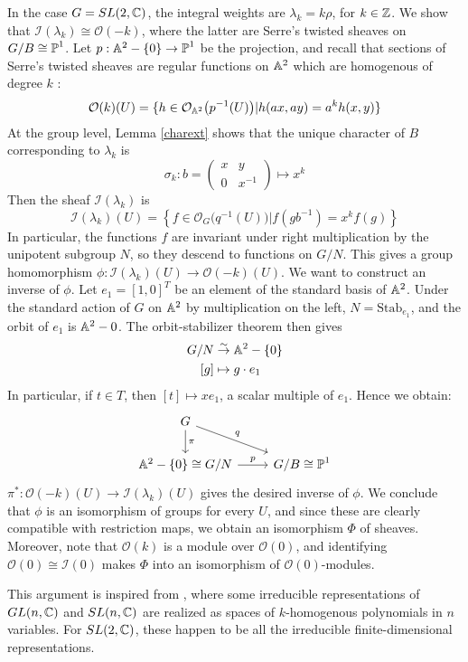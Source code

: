\begin{example}
In the case $G = SL(2,\mathbb{C})$, the integral weights are $\lambda_k = k \rho$, for $k \in \mathbb{Z}$. We show that $\mathcal{I}(\lambda_k) 
\cong \mathcal{O}(-k)$, where the latter are Serre's
twisted sheaves on $G/B \cong \operatorname{\mathbb{P}}^1$. Let $p: \mathbb{A}^2 - \{0\} \to \operatorname{\mathbb{P}}^1$ be the projection, and recall that sections 
of Serre's twisted sheaves are regular functions on $\mathbb{A}^2$ which are homogenous of degree $k$ :
\[	\mathcal{O}(k)(U) = \{ h \in \mathcal{O}_{\mathbb{A}^2}\big(p^{-1}(U)\big) | h(ax, ay) = a^k h(x,y) \}	\]
At the group level, Lemma \ref{charext} shows that the unique character of $B$ corresponding 
to $\lambda_k$ is
\[	\sigma_k : b = \left( \begin{array} {cc} x & y \\ 0 & x^{-1} \end{array} \right) \mapsto x^k \]
Then the sheaf $\mathcal{I}(\lambda_k)$ is
\[	\mathcal{I}(\lambda_k)(U) = \left\{ f \in \mathcal{O}_G\big(q^{-1}(U)\big) | f(gb^{-1}) = x^k f(g) \right\}	\]
In particular, the functions $f$ are invariant under right multiplication by the unipotent subgroup $N$, so they descend
to functions on $G/N$. This gives a group homomorphism $\phi : \mathcal{I}(\lambda_k)(U) \to \mathcal{O}(-k)(U)$. We want to
construct an inverse of $\phi$. Let $e_1 = [1, 0]^T$ be an element of the standard basis of $\mathbb{A}^2$. Under the standard
action of $G$ on $\mathbb{A}^2$ by multiplication on the left, $N = \text{Stab}_{e_1}$, and the orbit of $e_1$ is $\mathbb{A}^2 - 0$. The
orbit-stabilizer theorem then gives
\begin{align*}
G/N &\overset{\sim}{\to} \mathbb{A}^2 - \{0\} \\
[g] &\mapsto g \cdot e_1
\end{align*}
In particular, if $t\in T$, then $[t] \mapsto x e_1$, a scalar multiple of $e_1$. Hence we obtain:
\[
\begin{tikzcd}
G\arrow{dr}{q}\arrow{d}{\pi} &  \\
\A^2 - \{0\} \cong G/N \arrow{r}{p} & G/B \cong \PP^1
\end{tikzcd}
\]
$\pi^*: \mathcal{O}(-k)(U) \to \mathcal{I}(\lambda_k)(U)$ gives the desired inverse of $\phi$. We conclude that
$\phi$ is an isomorphism of groups for every $U$, and since these are clearly compatible with restriction maps,
we obtain an isomorphism $\Phi$ of sheaves. Moreover, note that $\mathcal{O}(k)$ is a module over $\mathcal{O}(0)$, and
identifying $\mathcal{O}(0) \cong \mathcal{I}(0)$ makes $\Phi$ into an isomorphism of $\mathcal{O}(0)$-modules.

This argument is inspired from , where some irreducible representations of $GL(n,\mathbb{C})$
and $SL(n,\mathbb{C})$ are realized as spaces of $k$-homogenous polynomials in $n$ variables. For $SL(2,\mathbb{C})$, these happen
to be all the irreducible finite-dimensional representations.
\end{example}










